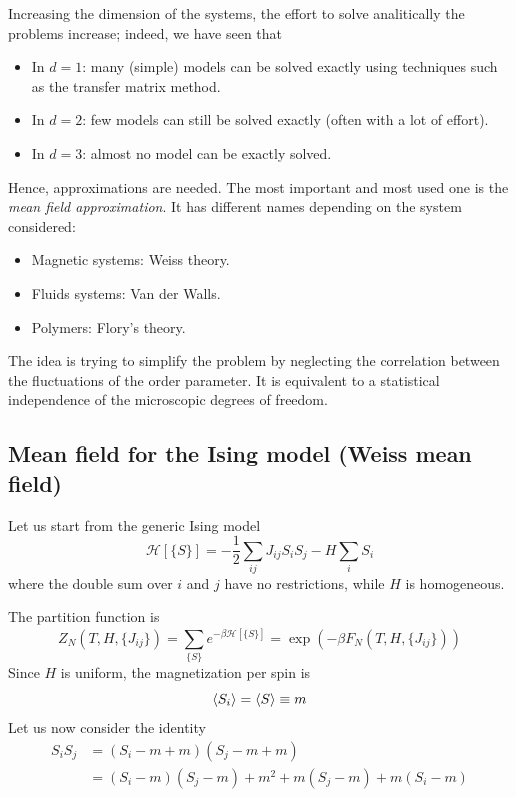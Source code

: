 \documentclass[../main/main.tex]{subfiles}
\begin{document}
Increasing the dimension of the systems, the effort to solve analitically the problems increase; indeed, we have seen that
\begin{itemize}
\item In \( d=1 \): many (simple) models can be solved exactly using techniques such as the transfer matrix method.
\item In \( d=2 \): few models can still be solved exactly (often with a lot of effort).
\item In \( d=3 \): almost no model can be exactly solved.
\end{itemize}
Hence, approximations are needed.
The most important and most used one is the \emph{mean field approximation}. 
It has different names depending on the system considered:
\begin{itemize}
\item Magnetic systems: Weiss theory.
\item Fluids systems: Van der Walls.
\item Polymers: Flory's theory.
\end{itemize}

The idea is trying to simplify the problem by neglecting the correlation between the fluctuations of the order parameter. It is equivalent to a statistical independence of the microscopic degrees of freedom.



\subsection{Mean field for the Ising model (Weiss mean field)}
Let us start from the generic Ising model
\begin{equation}
  \mathcal{H} [\{ S \}  ] =  -\frac{1}{2} \sum_{ij}^{} J_{ij} S_i S_j - H \sum_{i}^{} S_i
\end{equation}
where the double sum over \( i \) and \( j \) have no restrictions, while \( H \) is homogeneous.

The partition function is
\begin{equation}
  Z_N (T,H,\{ J_{ij} \}  )= \sum_{\{ S \}  }^{} e^{-\beta   \mathcal{H} [\{ S \}] } = \exp (-\beta F_N (T,H,\{ J_{ij} \}  ))
\end{equation}
Since \( H \) is uniform, the magnetization per spin is
\begin{equation*}
  \expval{S_i}  = \expval{S} \equiv m
\end{equation*}
Let us now consider the identity
\begin{equation*}
\begin{split}
  S_i S_j  &= (S_i - m + m) (S_j - m + m)  \\
  & = (S_i - m ) (S_j - m)  + m^2 + m (S_j-m) + m (S_i-m)
\end{split}
\end{equation*}
\end{document}
